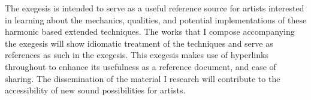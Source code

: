 The exegesis is intended to serve as a useful reference source for artists interested in learning about the mechanics, qualities, and potential implementations of these harmonic based extended techniques. 
The works that I compose accompanying the exegesis will show idiomatic treatment of the techniques and serve as references as such in the exegesis.
This exegesis makes use of hyperlinks throughout to enhance its usefulness as a reference document, and ease of sharing.
The dissemination of the material I research will contribute to the accessibility of new sound possibilities for artists.


